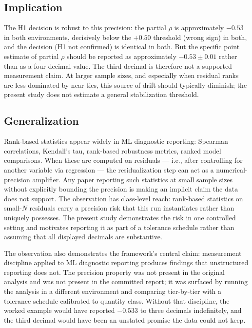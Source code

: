 \documentclass[10pt]{article}
\begin{document}
\subsection{Implication}

The H1 decision is robust to this precision: the partial $\rho$
is approximately $-0.53$ in both environments, decisively below the
$+0.50$ threshold (wrong sign) in both, and the decision (H1 not
confirmed) is identical in both. But the specific point estimate of
partial $\rho$ should be reported as approximately $-0.53 \pm 0.01$
rather than as a four-decimal value. The third decimal is therefore
not a supported measurement claim.
At larger sample sizes, and especially when residual ranks are less
dominated by near-ties, this source of drift should typically
diminish; the present study does not estimate a general stabilization
threshold.

\subsection{Generalization}

Rank-based statistics appear widely in ML diagnostic reporting:
Spearman correlations, Kendall's tau, rank-based robustness
metrics, ranked model comparisons. When these are computed on
residuals --- i.e., after controlling for another variable via
regression --- the residualization step can act as a
numerical-precision amplifier. Any paper reporting such
statistics at small sample sizes without explicitly bounding the
precision is making an implicit claim the data does not support.
The observation has class-level reach: rank-based statistics on
small-$N$ residuals carry a precision risk that this run
instantiates rather than uniquely possesses. The present study demonstrates the risk
in one controlled setting and motivates reporting it as part of a
tolerance schedule rather than assuming that all displayed
decimals are substantive.

The observation also demonstrates the framework's central claim:
measurement discipline applied to ML diagnostic reporting produces
findings that unstructured reporting does not. The precision
property was not present in the original analysis and was not
present in the committed report; it was surfaced by running the
analysis in a different environment and comparing tier-by-tier
with a tolerance schedule calibrated to quantity class. Without
that discipline, the worked example would have reported $-0.533$ to three
decimals indefinitely, and the third decimal would have been an
unstated promise the data could not keep.
\end{document}
